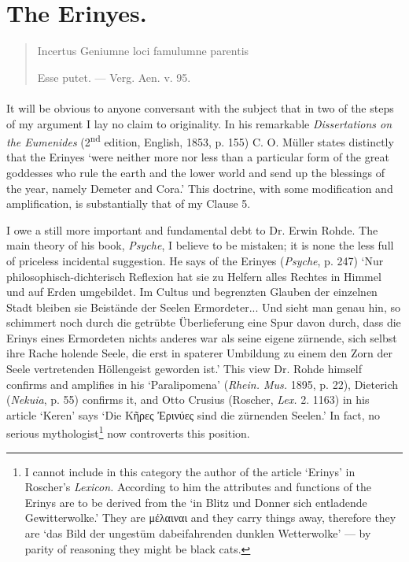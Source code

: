 \documentclass[a4paper, 11pt, oneside, polutonikogreek, english]{article}
\begin{document}
\section{The Erinyes.}
\begin{quotation}
Incertus Geniumne loci famulumne parentis  

Esse putet. --- Verg. Aen. v. 95.
\end{quotation}
\paragraph{}
It will be obvious to anyone conversant with the subject that in two of the steps of my argument I lay no claim to originality. In his remarkable \emph{Dissertations on the Eumenides} (2\textsuperscript{nd} edition, English, 1853, p. 155) C. O. Müller states distinctly that the Erinyes `were neither more nor less than a particular form of the great goddesses who rule the earth and the lower world and send up the blessings of the year, namely Demeter and Cora.' This doctrine, with some modification and amplification, is substantially that of my Clause 5.

I owe a still more important and fundamental debt to Dr. Erwin Rohde. The main theory of his book, \emph{Psyche}, I believe to be mistaken; it is none the less full of priceless incidental suggestion. He says of the Erinyes (\emph{Psyche}, p. 247) `Nur philosophisch-dichterisch Reflexion hat sie zu Helfern alles Rechtes in Himmel und auf Erden umgebildet. Im Cultus und begrenzten Glauben der einzelnen Stadt bleiben sie Beistände der Seelen Ermordeter... Und sieht man genau hin, so schimmert noch durch die getrübte Überlieferung eine Spur davon durch, dass die Erinys eines Ermordeten nichts anderes war als seine eigene zürnende, sich selbst ihre Rache holende Seele, die erst in spaterer Umbildung zu einem den Zorn der Seele vertretenden Höllengeist geworden ist.' This view Dr. Rohde himself confirms and amplifies in his `Paralipomena' (\emph{Rhein. Mus.} 1895, p. 22), Dieterich (\emph{Nekuia}, p. 55) confirms it, and Otto Crusius (Roscher, \emph{Lex.} 2. 1163) in his article `Keren' says `Die Κῆρες Ἐρινύες sind die zürnenden Seelen.' In fact, no serious mythologist\footnote{I cannot include in this category the author of the article `Erinys' in Roscher's \emph{Lexicon.} According to him the attributes and functions of the Erinys are to be derived from the `in Blitz und Donner sich entladende Gewitterwolke.' They are μέλαιναι and they carry things away, therefore they are `das Bild der ungestüm dabeifahrenden dunklen Wetterwolke' --- by parity of reasoning they might be black cats.} now controverts this position.
\end{document}

